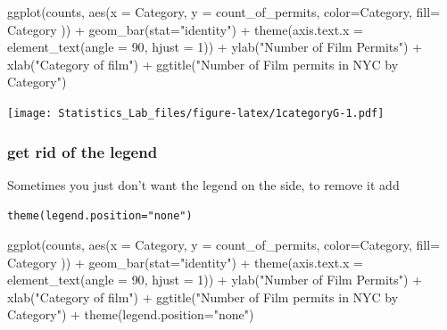 \documentclass[
]{book}
\newenvironment{Shaded}{\begin{snugshade}}{\end{snugshade}}
\newcommand{\AttributeTok}[1]{\textcolor[rgb]{0.77,0.63,0.00}{#1}}
\newcommand{\DecValTok}[1]{\textcolor[rgb]{0.00,0.00,0.81}{#1}}
\newcommand{\FunctionTok}[1]{\textcolor[rgb]{0.00,0.00,0.00}{#1}}
\newcommand{\NormalTok}[1]{#1}
\newcommand{\SpecialCharTok}[1]{\textcolor[rgb]{0.00,0.00,0.00}{#1}}
\newcommand{\StringTok}[1]{\textcolor[rgb]{0.31,0.60,0.02}{#1}}
\begin{document}
\begin{Shaded}
\begin{Highlighting}[]
\FunctionTok{ggplot}\NormalTok{(counts, }\FunctionTok{aes}\NormalTok{(}\AttributeTok{x =}\NormalTok{ Category, }\AttributeTok{y =}\NormalTok{ count\_of\_permits, }
                   \AttributeTok{color=}\NormalTok{Category, }
                   \AttributeTok{fill=}\NormalTok{ Category )) }\SpecialCharTok{+}
  \FunctionTok{geom\_bar}\NormalTok{(}\AttributeTok{stat=}\StringTok{"identity"}\NormalTok{) }\SpecialCharTok{+} 
  \FunctionTok{theme}\NormalTok{(}\AttributeTok{axis.text.x =} \FunctionTok{element\_text}\NormalTok{(}\AttributeTok{angle =} \DecValTok{90}\NormalTok{, }\AttributeTok{hjust =} \DecValTok{1}\NormalTok{)) }\SpecialCharTok{+}
  \FunctionTok{ylab}\NormalTok{(}\StringTok{"Number of Film Permits"}\NormalTok{) }\SpecialCharTok{+} 
  \FunctionTok{xlab}\NormalTok{(}\StringTok{"Category of film"}\NormalTok{) }\SpecialCharTok{+}
  \FunctionTok{ggtitle}\NormalTok{(}\StringTok{"Number of Film permits in NYC by Category"}\NormalTok{)}
\end{Highlighting}
\end{Shaded}

\texttt{[image: Statistics\_Lab\_files/figure-latex/1categoryG-1.pdf]}

\hypertarget{get-rid-of-the-legend}{%
\subsubsection{get rid of the legend}\label{get-rid-of-the-legend}}

Sometimes you just don't want the legend on the side, to remove it add

\texttt{theme(legend.position="none")}

\begin{Shaded}
\begin{Highlighting}[]
\FunctionTok{ggplot}\NormalTok{(counts, }\FunctionTok{aes}\NormalTok{(}\AttributeTok{x =}\NormalTok{ Category, }\AttributeTok{y =}\NormalTok{ count\_of\_permits, }
                   \AttributeTok{color=}\NormalTok{Category, }
                   \AttributeTok{fill=}\NormalTok{ Category )) }\SpecialCharTok{+}
  \FunctionTok{geom\_bar}\NormalTok{(}\AttributeTok{stat=}\StringTok{"identity"}\NormalTok{) }\SpecialCharTok{+} 
  \FunctionTok{theme}\NormalTok{(}\AttributeTok{axis.text.x =} \FunctionTok{element\_text}\NormalTok{(}\AttributeTok{angle =} \DecValTok{90}\NormalTok{, }\AttributeTok{hjust =} \DecValTok{1}\NormalTok{)) }\SpecialCharTok{+}
  \FunctionTok{ylab}\NormalTok{(}\StringTok{"Number of Film Permits"}\NormalTok{) }\SpecialCharTok{+} 
  \FunctionTok{xlab}\NormalTok{(}\StringTok{"Category of film"}\NormalTok{) }\SpecialCharTok{+}
  \FunctionTok{ggtitle}\NormalTok{(}\StringTok{"Number of Film permits in NYC by Category"}\NormalTok{) }\SpecialCharTok{+}
  \FunctionTok{theme}\NormalTok{(}\AttributeTok{legend.position=}\StringTok{"none"}\NormalTok{)}
\end{Highlighting}
\end{Shaded}
\end{document}
